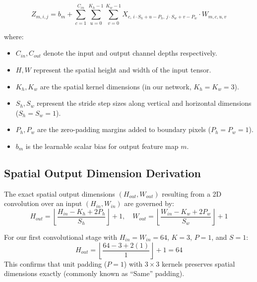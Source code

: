\documentclass[11pt,a4paper,oneside]{report}
\begin{document}
\begin{equation}
    Z_{m, i, j} = b_m + \sum_{c=1}^{C_{in}} \sum_{u=0}^{K_h - 1} \sum_{v=0}^{K_w - 1} X_{c, \, i \cdot S_h + u - P_h, \, j \cdot S_w + v - P_w} \cdot W_{m, c, u, v}
\end{equation}

where:
\begin{itemize}
    \item $C_{in}, C_{out}$ denote the input and output channel depths respectively.
    \item $H, W$ represent the spatial height and width of the input tensor.
    \item $K_h, K_w$ are the spatial kernel dimensions (in our network, $K_h = K_w = 3$).
    \item $S_h, S_w$ represent the stride step sizes along vertical and horizontal dimensions ($S_h = S_w = 1$).
    \item $P_h, P_w$ are the zero-padding margins added to boundary pixels ($P_h = P_w = 1$).
    \item $b_m$ is the learnable scalar bias for output feature map $m$.
\end{itemize}

\subsection{Spatial Output Dimension Derivation}
The exact spatial output dimensions $(H_{out}, W_{out})$ resulting from a 2D convolution over an input $(H_{in}, W_{in})$ are governed by:
\begin{equation}
    H_{out} = \left\lfloor \frac{H_{in} - K_h + 2P_h}{S_h} \right\rfloor + 1, \quad W_{out} = \left\lfloor \frac{W_{in} - K_w + 2P_w}{S_w} \right\rfloor + 1
\end{equation}

For our first convolutional stage with $H_{in}=W_{in}=64$, $K=3$, $P=1$, and $S=1$:
\begin{equation}
    H_{out} = \left\lfloor \frac{64 - 3 + 2(1)}{1} \right\rfloor + 1 = 64
\end{equation}
This confirms that unit padding ($P=1$) with $3\times3$ kernels preserves spatial dimensions exactly (commonly known as ``Same'' padding).
\end{document}
